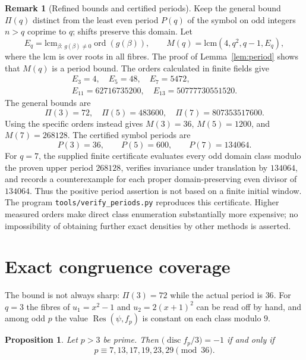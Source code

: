 \documentclass[11pt,a4paper]{amsart}
\newcommand{\disc}{\operatorname{disc}}
\newcommand{\Res}{\operatorname{Res}}
\theoremstyle{plain}
\newtheorem{proposition}[theorem]{Proposition}
\theoremstyle{definition}
\newtheorem{remark}[theorem]{Remark}
\begin{document}
\begin{remark}[Refined bounds and certified periods]
\label{rem:periodgrow}
Keep the general bound \(\Pi(q)\) distinct from the least even period \(P(q)\) of the symbol on odd integers \(n>q\) coprime to \(q\); shifts preserve this domain. Let
\[
 E_q=\mathrm{lcm}_{\beta:\,g(\beta)\ne0}\operatorname{ord}(g(\beta)),\qquad
 M(q)=\mathrm{lcm}(4,q^2,q-1,E_q),
\]
where the lcm is over roots in all fibres. The proof of Lemma~\ref{lem:period} shows that \(M(q)\) is a period bound. The orders calculated in finite fields give
\[
 \begin{gathered}
 E_3=4,\quad E_5=48,\quad E_7=5472,\\
 E_{11}=62716735200,\quad E_{13}=50777730551520.
 \end{gathered}
\]
The general bounds are
\[
 \Pi(3)=72,\quad \Pi(5)=483600,\quad \Pi(7)=807353517600.
\] Using the specific orders instead gives \(M(3)=36\), \(M(5)=1200\), and \(M(7)=268128\). The certified symbol periods are
\[
 P(3)=36,\qquad P(5)=600,\qquad P(7)=134064.
\]
For \(q=7\), the supplied finite certificate evaluates every odd domain class modulo the proven upper period \(268128\), verifies invariance under translation by \(134064\), and records a counterexample for each proper domain-preserving even divisor of \(134064\). Thus the positive period assertion is not based on a finite initial window. The program \texttt{tools/verify\_periods.py} reproduces this certificate. Higher measured orders make direct class enumeration substantially more expensive; no impossibility of obtaining further exact densities by other methods is asserted.
\end{remark}

\section{Exact congruence coverage}
\label{sec:coverage}

The bound is not always sharp: \(\Pi(3)=72\) while the actual period is \(36\). For \(q=3\) the fibres of \(u_1=x^2-1\) and \(u_2=2(x+1)^2\) can be read off by hand, and among odd \(p\) the value \(\Res(\psi,f_p)\) is constant on each class modulo \(9\).

\begin{proposition}
\label{prop:q3}
Let \(p>3\) be prime. Then \(\bigl(\disc f_p/3\bigr)=-1\) if and only if
\[
p\equiv 7,13,17,19,23,29\pmod{36}.
\]
\end{proposition}
\end{document}
